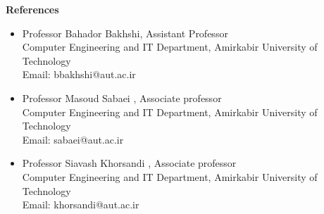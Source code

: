 \documentclass[a4paper,12pt,final]{memoir}
\newcommand{\SmallSep}{\vspace{0.5em}}
\newcommand{\CVSection}[1]
	{\Large\textbf{#1}\par
	\SmallSep\normalsize\normalfont}
\begin{document}
\CVSection{References}
	\begin{itemize}
		\item {Professor Bahador Bakhshi, Assistant Professor \\
Computer Engineering and IT Department, Amirkabir University of Technology\\
Email: bbakhshi@aut.ac.ir}

		\item {Professor Masoud Sabaei , Associate professor\\ 
		Computer Engineering and IT Department, Amirkabir University of Technology\\
Email: sabaei@aut.ac.ir } 
		\item {Professor Siavash Khorsandi , Associate professor\\ 
		Computer Engineering and IT Department, Amirkabir University of Technology\\
Email: khorsandi@aut.ac.ir }
	\end{itemize}
\end{document}
